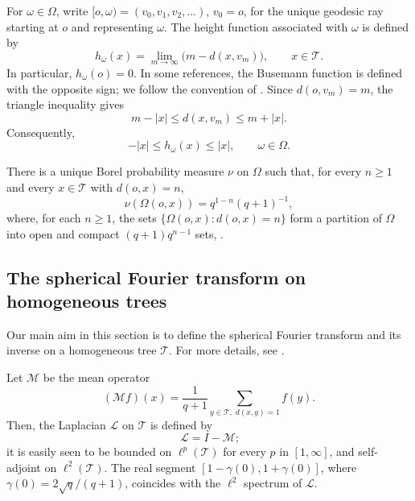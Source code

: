\documentclass[11pt,a4paper,reqno]{amsart}
\renewcommand\mathcal{\mathscr}
\theoremstyle{plain}
\theoremstyle{remark}
\theoremstyle{definition}
\theoremstyle{remark}
\numberwithin{equation}{section}
\begin{document}
For $\omega\in\Omega$, write $[o,\omega)=(v_0,v_1,v_2,\ldots)$, $v_0=o$,
for the unique geodesic ray starting at $o$ and representing $\omega$.
The height function associated with $\omega$ is defined by
\[
h_\omega(x)
=
\lim_{m\to\infty}\bigl(m-d(x,v_m)\bigr),
\qquad x\in\mathcal T.
\]
In particular, $h_\omega(o)=0$. In some references, the Busemann
function is defined with the opposite sign; we follow the convention
of \cite{CMS0}. Since $d(o,v_m)=m$, the triangle inequality gives
\[
m-|x|\leq d(x,v_m)\leq m+|x|.
\]
Consequently,
\begin{equation}\label{eq:Busemann_bds}
-|x|\leq h_\omega(x)\leq |x|,
\qquad \omega\in\Omega.
\end{equation}


There is a unique Borel probability measure $\nu$ on $\Omega$ such that, for every $n\geq1$ and every
$x\in\mathcal T$ with $d(o,x)=n$,
\[
\nu(\Omega(o,x))
=
{q^{1-n}}{(q+1)^{-1}},
\]
where, for each $n\geq1$, the sets $\{\Omega(o,x):d(o,x)=n\}$
form a partition of $\Omega$ into open and compact $(q+1)q^{n-1}$ sets, \cite[p.5]{Figa}.


	
	\subsection{The spherical Fourier transform on homogeneous trees}\label{sec:FT}
	Our main aim in this section is to define the spherical Fourier transform and its inverse on a homogeneous tree $\mathcal{T}$. For more details, see \cite{CMS0, CMS, Figa, VECA}.
	
	Let $\mathcal{M}$ be the mean operator
	\begin{equation*}
		(\mathcal{M}f)(x)=\frac{1}{q+1}\sum\limits_{y\in \mathcal{T},\; d(x,y)=1}f(y).
	\end{equation*} Then, the Laplacian $\mathcal{L}$ on $\mathcal{T}$ is defined by
	\[\
	\mathcal{L}=I-\mathcal{M};
	\]
	it is easily seen to be bounded on $\ell^p(\mathcal{T})$ for every $p$ in $[1, \infty]$, and self-adjoint on $\ell^2(\mathcal{T})$. The real segment $[1-\gamma(0),1+\gamma(0)]$, where $\gamma(0)=2\sqrt{q}/(q+1)$, coincides with the $\ell^2$ spectrum of $\mathcal{L}$.
\end{document}

